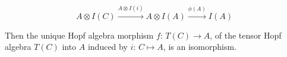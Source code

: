 $$A \otimes I(C) \xrightarrow{A \otimes I(i)} A \otimes I(A) \xrightarrow{\phi(A)} I(A)$$

Then the unique Hopf algebra morphism $f$: $T(C) \rightarrow A$, of the tensor Hopf algebra $T(C)$ into $A$ induced by $i$: $C \mapsto A$, is an isomorphism.
